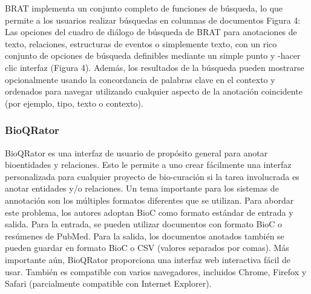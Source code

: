 BRAT implementa un conjunto completo de funciones de búsqueda, lo que permite a los usuarios realizar búsquedas en columnas de documentos Figura 4: Las opciones del cuadro de diálogo de búsqueda de BRAT para anotaciones de texto, relaciones, estructuras de eventos o simplemente texto, con un rico conjunto de opciones de búsqueda definibles mediante un simple punto y -hacer clic
interfaz (Figura 4). Además, los resultados de la búsqueda pueden mostrarse opcionalmente usando la concordancia de palabras clave en el contexto y ordenados para navegar
utilizando cualquier aspecto de la anotación coincidente (por ejemplo, tipo, texto o contexto).

\subsubsection*{BioQRator}

BioQRator es una interfaz de usuario de propósito general para anotar bioentidades y relaciones. 
Esto le permite a uno crear fácilmente una interfaz personalizada para cualquier proyecto de bio-curación si la tarea involucrada es anotar entidades y/o relaciones. 
Un tema importante para los sistemas de annotación son los múltiples formatos diferentes que se utilizan. 
Para abordar este problema, los autores adoptan BioC como formato estándar de entrada y salida. 
Para la entrada, se pueden utilizar documentos con formato BioC o resúmenes de PubMed. 
Para la salida, los documentos anotados también se pueden guardar en formato BioC o CSV (valores separados por comas). Más importante aún, BioQRator proporciona una interfaz web interactiva fácil de usar. 
También es compatible con varios navegadores, incluidos Chrome, Firefox y Safari (parcialmente compatible con Internet Explorer).


